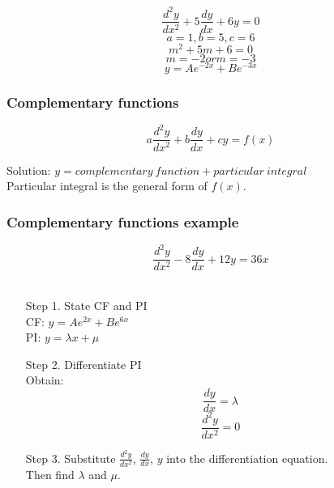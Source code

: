 \documentclass[a4paper,9pt]{scrartcl}
\begin{document}
    \begin{displaymath}
        \frac{d^{2}y}{dx^2} + 5\frac{dy}{dx} + 6y = 0
    \end{displaymath}
    \begin{displaymath}
        a = 1, b = 5, c = 6
    \end{displaymath}
    \begin{displaymath}
        m^2 + 5m + 6 = 0
    \end{displaymath}
    \begin{displaymath}
        m = -2 or m = -3
    \end{displaymath}
    \begin{displaymath}
        y = Ae^{-2x}+Be^{-3x}
    \end{displaymath}

    \subsubsection{Complementary functions}

    \begin{displaymath}
        a\frac{d^{2}y}{dx^2} + b\frac{dy}{dx} + cy = f(x)
    \end{displaymath}

    Solution: $y = complementary\ function + particular\ integral$ \\

    Particular integral is the general form of $f(x)$. \\

    \subsubsection{Complementary functions example}

    \begin{displaymath}
        \frac{d^{2}y}{dx^2} -8\frac{dy}{dx} + 12y = 36x
    \end{displaymath} \\
    \begin{itemize}
        \item [Step 1.] State CF and PI\\
        CF: $y = Ae^{2x}+Be^{6x}$\\
        PI: $y = {\lambda}x + \mu$\\

        \item [Step 2.] Differentiate PI\\
        Obtain: \\
        \begin{displaymath}
            \frac{dy}{dx} = \lambda
        \end{displaymath}
        \begin{displaymath}
            \frac{d^{2}y}{dx^2} = 0
        \end{displaymath}

        \item [Step 3.] Substitute $\frac{d^{2}y}{dx^2}$, $\frac{dy}{dx}$, $y$ into the differentiation equation.\\
        Then find $\lambda$ and $\mu$.
    \end{itemize}
\end{document}
